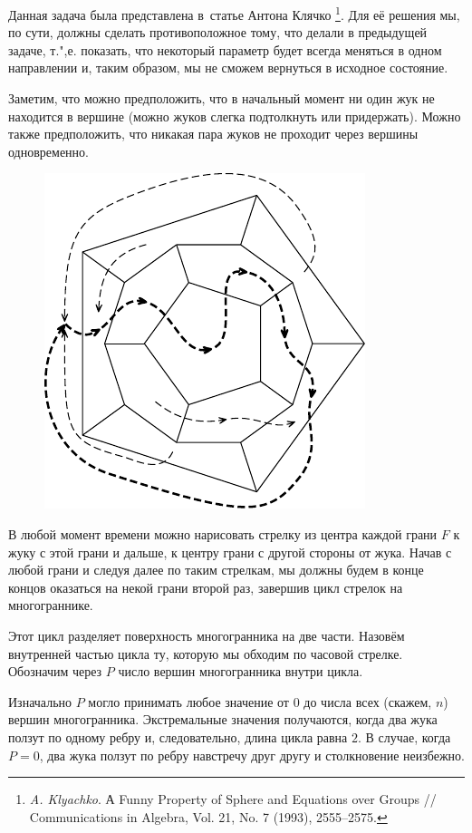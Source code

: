 \documentclass[twoside]{book}
\begin{document}
Данная задача была представлена в~статье Антона Клячко%
\footnote{\emph{A. Klyachko}. А Funny Property of Sphere and Equations over Groups /\!/ {Com\-mu\-ni\-ca\-tions in Algebra}, Vol. 21, No. 7 (1993), 2555--2575.}. 
Для её решения мы, по сути, должны сделать противоположное тому, что делали в предыдущей задаче, т.",е. показать, что некоторый параметр будет всегда меняться в одном направлении и, таким образом, мы не сможем вернуться в исходное состояние.

\medskip

Заметим, что можно предположить, что в начальный момент ни один жук не находится в вершине (можно жуков слегка подтолкнуть или придержать).
Можно также предположить, что никакая пара жуков не проходит через вершины одновременно.

\begin{figure}[!ht]
\centering
\includegraphics{mp/wink-22}
\end{figure}

В любой момент времени можно нарисовать стрелку из центра каждой грани $F$ к жуку с этой грани и дальше, к центру грани с другой стороны от жука.
Начав с любой грани и следуя далее по таким стрелкам, мы должны будем в конце концов оказаться на некой грани второй раз, завершив цикл стрелок на многограннике.

Этот цикл разделяет поверхность многогранника на две части.
Назовём внутренней частью цикла ту, которую мы обходим по часовой стрелке.
Обозначим через $P$ число вершин многогранника внутри цикла.

Изначально $P$ могло принимать любое значение от $0$ до числа всех (скажем, $n$) вершин многогранника.
Экстремальные значения получаются, когда два жука ползут по одному ребру и, следовательно, длина цикла равна $2$.
В случае, когда $P=0$, два жука ползут по ребру навстречу друг другу и столкновение неизбежно.
\end{document}
